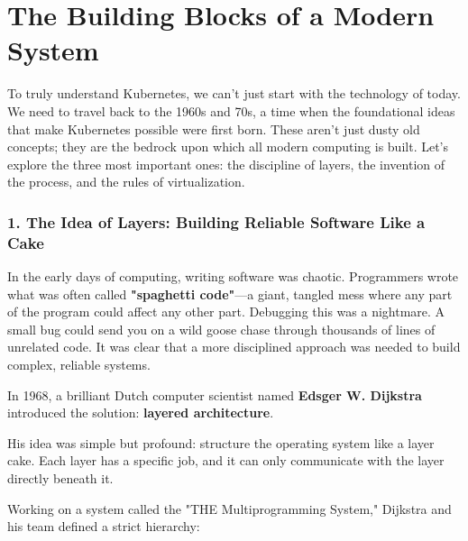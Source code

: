 \chapter{The Building Blocks of a Modern System}


To truly understand Kubernetes, we can't just start with the technology of today. We need to travel back to the 1960s and 70s, a time when the foundational ideas that make Kubernetes possible were first born. These aren't just dusty old concepts; they are the bedrock upon which all modern computing is built. Let's explore the three most important ones: the discipline of layers, the invention of the process, and the rules of virtualization.


\subsection{1. The Idea of Layers: Building Reliable Software Like a Cake}


In the early days of computing, writing software was chaotic. Programmers wrote what was often called \textbf{"spaghetti code"}---a giant, tangled mess where any part of the program could affect any other part. Debugging this was a nightmare. A small bug could send you on a wild goose chase through thousands of lines of unrelated code. It was clear that a more disciplined approach was needed to build complex, reliable systems.

In 1968, a brilliant Dutch computer scientist named \textbf{Edsger W. Dijkstra} introduced the solution: \textbf{layered architecture}.

His idea was simple but profound: structure the operating system like a layer cake. Each layer has a specific job, and it can only communicate with the layer directly beneath it.

Working on a system called the "THE Multiprogramming System," Dijkstra and his team defined a strict hierarchy:

